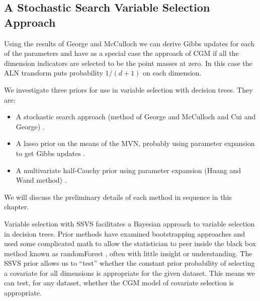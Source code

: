 
\subsection{A Stochastic Search Variable Selection Approach}

Using the results of George and McCulloch we can derive Gibbs updates for each of the parameters and have as a special case the approach of CGM if all the dimension indicators are selected to be the point masses at zero. In this case the ALN transform puts probability $1/(d+1)$ on each dimension. 


We investigate three priors for use in variable selection with decision trees. They are: 

\begin{itemize}
\item A stochastic search approach (method of George and McCulloch and Cui and George) \cite{cui2008empirical,george1993variable}. 
\item A lasso prior on the means of the MVN,  probably using parameter expansion to get Gibbs updates \cite{park2008bayesian}. 
\item A multivariate half-Cauchy prior using parameter expansion (Huang and Wand method) \cite{huang2013simple,polson2011half,carvalho2010horseshoe,carvalhohandling}. 
\end{itemize}

We will discuss the preliminary details of each method in sequence in this chapter. 

Variable selection with SSVS facilitates a Bayesian approach to variable selection in decision trees. Prior methods have examined bootstrapping approaches and used some complicated math to allow the statistician to peer inside the black box method known as randomForest \cite{ishwaran2010high, ishwaran2007variable}, often with little insight or understanding. The SSVS prior allows us to ``test'' whether the constant prior probability of selecting a covariate for all dimensions is appropriate for the given dataset. This means we can test, for any dataset, whether the CGM model of covariate selection is appropriate.


